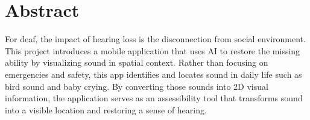 \chapter*{Abstract}
\label{chap:abstract}

For deaf, the impact of hearing loss is the disconnection from social environment.
This project introduces a mobile application that uses AI to restore the missing ability by visualizing sound in spatial context.
Rather than focusing on emergencies and safety, this app identifies and locates sound in daily life such as bird sound and baby crying.
By converting those sounds into 2D visual information, the application serves as an assessibility tool that transforms sound into a visible location and restoring a sense of hearing.